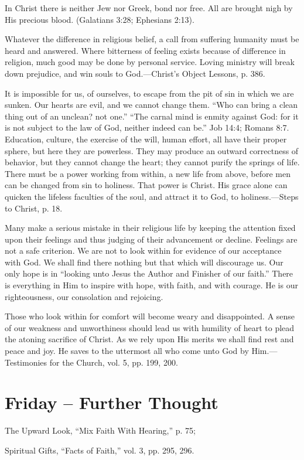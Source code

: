 \documentclass[a4paper, 10pt, twoside, headings=small]{scrartcl}
\begin{document}
\begin{multicols}{2}
In Christ there is neither Jew nor Greek, bond nor free. All are brought nigh by His precious blood. (Galatians 3:28; Ephesians 2:13).

Whatever the difference in religious belief, a call from suffering humanity must be heard and answered. Where bitterness of feeling exists because of difference in religion, much good may be done by personal service. Loving ministry will break down prejudice, and win souls to God.—Christ’s Object Lessons, p. 386.

It is impossible for us, of ourselves, to escape from the pit of sin in which we are sunken. Our hearts are evil, and we cannot change them. “Who can bring a clean thing out of an unclean? not one.” “The carnal mind is enmity against God: for it is not subject to the law of God, neither indeed can be.” Job 14:4; Romans 8:7. Education, culture, the exercise of the will, human effort, all have their proper sphere, but here they are powerless. They may produce an outward correctness of behavior, but they cannot change the heart; they cannot purify the springs of life. There must be a power working from within, a new life from above, before men can be changed from sin to holiness. That power is Christ. His grace alone can quicken the lifeless faculties of the soul, and attract it to God, to holiness.—Steps to Christ, p. 18.

Many make a serious mistake in their religious life by keeping the attention fixed upon their feelings and thus judging of their advancement or decline. Feelings are not a safe criterion. We are not to look within for evidence of our acceptance with God. We shall find there nothing but that which will discourage us. Our only hope is in “looking unto Jesus the Author and Finisher of our faith.” There is everything in Him to inspire with hope, with faith, and with courage. He is our righteousness, our consolation and rejoicing.

Those who look within for comfort will become weary and disappointed. A sense of our weakness and unworthiness should lead us with humility of heart to plead the atoning sacrifice of Christ. As we rely upon His merits we shall find rest and peace and joy. He saves to the uttermost all who come unto God by Him.—Testimonies for the Church, vol. 5, pp. 199, 200.

\section*{Friday – Further Thought}

\setlength{\parindent}{0pt}The Upward Look, “Mix Faith With Hearing,” p. 75;

Spiritual Gifts, “Facts of Faith,” vol. 3, pp. 295, 296.

\end{multicols}
\end{document}
